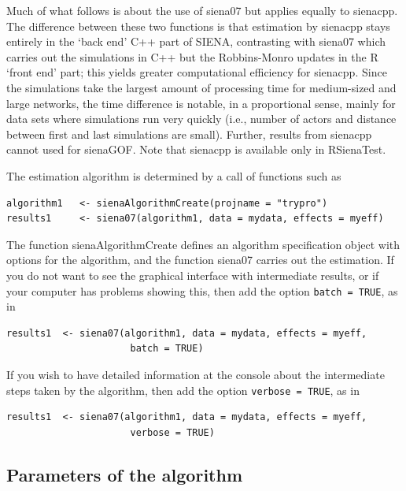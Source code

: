 \documentclass[a4paper,fleqn,11pt]{article}
\newcommand{\+}{\, + \,}
\newcommand{\sfn}[1]{\textsf{#1}}
\newcommand{\si}{{\sf SIENA}}
\begin{document}
Much of what follows is about the use of \sfn{siena07}
but applies equally to \sfn{sienacpp}.
The difference between these two functions is that
estimation by \sfn{sienacpp} stays entirely in the
`back end' \sfn{C++} part of \si, contrasting with \sfn{siena07}
which carries out the simulations in \sfn{C++} but the
Robbins-Monro updates in the \sfn{R} `front end' part;
this yields greater computational efficiency for \sfn{sienacpp}.
Since the simulations take the largest amount of processing time
for medium-sized and large networks, the time difference is
notable, in a proportional sense, mainly for data sets
where simulations run very quickly (i.e., number of actors
and distance between first and last simulations are small).
Further, results from \sfn{sienacpp} cannot used for
\sfn{sienaGOF}.
Note that \sfn{sienacpp} is available only in \sfn{RSienaTest}.

The estimation algorithm is determined by a call of functions
such as
\begin{verbatim}
algorithm1   <- sienaAlgorithmCreate(projname = "trypro")
results1     <- siena07(algorithm1, data = mydata, effects = myeff)
\end{verbatim}
The function \textsf{sienaAlgorithmCreate} defines an algorithm specification
object with options for the algorithm, and the function  \textsf{siena07}
carries out the estimation.
If you do not want to see the graphical interface with intermediate
results, or if your computer has problems showing this, then add
the option \texttt{batch = TRUE}, as in
\begin{verbatim}
results1  <- siena07(algorithm1, data = mydata, effects = myeff,
                      batch = TRUE)
\end{verbatim}
If you wish to have detailed information at the console about the intermediate
steps taken by the algorithm, then add
the option \texttt{verbose = TRUE}, as in
\begin{verbatim}
results1  <- siena07(algorithm1, data = mydata, effects = myeff,
                      verbose = TRUE)
\end{verbatim}

\subsection{Parameters of the algorithm}
\label{S_param}
\end{document}
